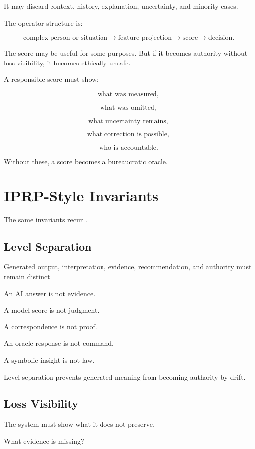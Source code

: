 \documentclass[11pt]{book}
\begin{document}
It may discard context, history, explanation, uncertainty, and minority cases.

The operator structure is:

\[
\text{complex person or situation}
\rightarrow
\text{feature projection}
\rightarrow
\text{score}
\rightarrow
\text{decision}.
\]

The score may be useful for some purposes. But if it becomes authority without loss visibility, it becomes ethically unsafe.

A responsible score must show:

\[
\text{what was measured},
\]

\[
\text{what was omitted},
\]

\[
\text{what uncertainty remains},
\]

\[
\text{what correction is possible},
\]

\[
\text{who is accountable}.
\]

Without these, a score becomes a bureaucratic oracle.

\section{IPRP-Style Invariants}

The same invariants recur \cite{Cameron2026PMC,Cameron2026IPRP}.

\subsection{Level Separation}

Generated output, interpretation, evidence, recommendation, and authority must remain distinct.

An AI answer is not evidence.

A model score is not judgment.

A correspondence is not proof.

An oracle response is not command.

A symbolic insight is not law.

Level separation prevents generated meaning from becoming authority by drift.

\subsection{Loss Visibility}

The system must show what it does not preserve.

What evidence is missing?
\end{document}
